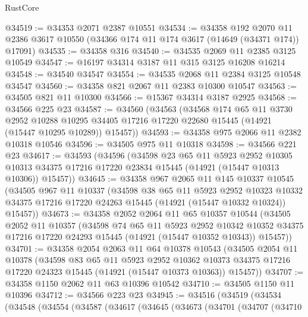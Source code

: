\begin{lexlean}{RustCore}
\begin{coremodule}
@34519 := @34353 @2071 @2387 @10551
@34534 := @34358
    @192
    @2070
    @11
    @2386
    @3617
    @10550
    (@34366 @174 @11 @174 @3617 (@14649 (@34371 @174)) @17091)
@34535 := @34358 @316
@34540 := @34535 @2069 @11 @2385 @3125 @10549
@34547 := @16197 @34314 @3187 @11 @315 @3125 @16208 @16214
@34548 := @34540 @34547
@34554 := @34535 @2068 @11 @2384 @3125 @10548 @34547
@34560 := @34358 @821 @2067 @11 @2383 @10300 @10547
@34563 := @34505 @821 @11 @10300
@34566 := @15367 @34314 @3187 @2925
@34568 := @34566 @225 @23
@34587 := @34560
    (@34563
      (@34568
        @174
        @65
        @11
        @3730
        @2952
        @10288
        @10295
        @34405
        @17216
        @17220
        @22680
        @15445
        (@14921 (@15447 @10295 @10289))
        @15457))
@34593 := @34358 @975 @2066 @11 @2382 @10318 @10546
@34596 := @34505 @975 @11 @10318
@34598 := @34566 @221 @23
@34617 := @34593
    (@34596
      (@34598
        @23
        @65
        @11
        @5923
        @2952
        @10305
        @10313
        @34375
        @17216
        @17220
        @23834
        @15445
        (@14921 (@15447 @10313 @10306))
        @15457))
@34645 := @34358
    @967
    @2065
    @11
    @145
    @10337
    @10545
    (@34505
      @967
      @11
      @10337
      (@34598
        @38
        @65
        @11
        @5923
        @2952
        @10323
        @10332
        @34375
        @17216
        @17220
        @24263
        @15445
        (@14921 (@15447 @10332 @10324))
        @15457))
@34673 := @34358
    @2052
    @2064
    @11
    @65
    @10357
    @10544
    (@34505
      @2052
      @11
      @10357
      (@34598
        @74
        @65
        @11
        @5923
        @2952
        @10342
        @10352
        @34375
        @17216
        @17220
        @24293
        @15445
        (@14921 (@15447 @10352 @10343))
        @15457))
@34701 := @34358
    @2054
    @2063
    @11
    @64
    @10378
    @10543
    (@34505
      @2054
      @11
      @10378
      (@34598
        @83
        @65
        @11
        @5923
        @2952
        @10362
        @10373
        @34375
        @17216
        @17220
        @24323
        @15445
        (@14921 (@15447 @10373 @10363))
        @15457))
@34707 := @34358 @1150 @2062 @11 @63 @10396 @10542
@34710 := @34505 @1150 @11 @10396
@34712 := @34566 @223 @23
@34945 := @34516
    (@34519
      (@34534
        (@34548
          (@34554
            (@34587
              (@34617
                (@34645
                  (@34673
                    (@34701
                      (@34707
                        (@34710

\end{coremodule}
\end{lexlean}
